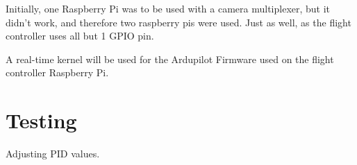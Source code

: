 Initially, one Raspberry Pi was to be used with a camera multiplexer, but it didn't work, and therefore two raspberry pis were used. Just as well, as the flight controller uses all but 1 GPIO pin.

A real-time kernel will be used for the Ardupilot Firmware used on the flight controller Raspberry Pi.

\section{Testing}

Adjusting PID values.